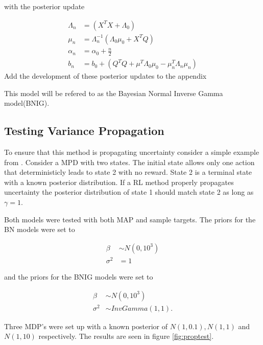 with the posterior update

\begin{align*}
    \label{eq:unknown_noise_posterior_update}
	\Lambda_n & = (X^TX + \Lambda_0)                                         \\
	\mu_n     & = \Lambda_n^{-1}(\Lambda_0\mu_0 + X^TQ)                      \\
	\alpha_n  & = \alpha_0 + \frac{n}{2}                                     \\
	b_n       & = b_0 + (Q^TQ + \mu^T\Lambda_0\mu_0 - \mu_n^T\Lambda_n\mu_n) 
\end{align*}
\todo Add the development of these posterior updates to the appendix

This model will be refered to as the Bayesian Normal Inverse Gamma model(BNIG).

\subsection{Testing Variance Propagation}

To ensure that this method is propagating uncertainty consider a simple example from \cite{osband_2018}. Consider a MPD with two states. The initial state allows only one action that deterministicly leads to state 2 with no reward. State 2 is a terminal state with a known posterior distribution. If a RL method properly propagates uncertainty the posterior distribution of state 1 should match state 2 as long as $\gamma=1$. 

Both models were tested with both MAP and sample targets. The priors for the BN models were set to

\begin{align*}
    \beta &\sim N(0,10^3)\\
    \sigma^2 &= 1
\end{align*}

and the priors for the BNIG models were set to

\begin{align*}
    \beta &\sim N(0,10^3) \\
    \sigma^2 &\sim InvGamma(1,1).
\end{align*}

Three MDP's were set up with a known posterior of $N(1, 0.1), N(1, 1)$ and $N(1, 10)$ respectively. The results are seen in figure \ref{fig:proptest}.

